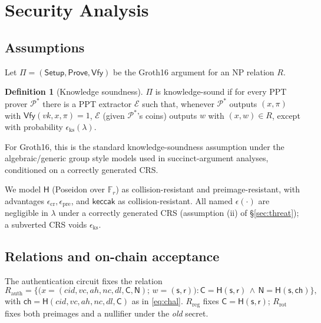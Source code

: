 \documentclass[11pt]{article}
\theoremstyle{definition}
\newtheorem{definition}{Definition}
\theoremstyle{plain}
\newcommand{\Hash}{\mathsf{H}}       %
\newcommand{\keccak}{\mathsf{keccak}}
\newcommand{\Fr}{\mathbb{F}_r}       %
\newcommand{\secret}{\mathsf{s}}
\newcommand{\salt}{\mathsf{r}}
\newcommand{\commit}{\mathsf{C}}
\newcommand{\chal}{\mathsf{ch}}
\newcommand{\nul}{\mathsf{N}}
\begin{document}
\section{Security Analysis}
\label{sec:security}

\subsection{Assumptions}
\label{sec:assumptions}
Let $\Pi=(\mathsf{Setup},\mathsf{Prove},\mathsf{Vfy})$ be the Groth16 argument for an
NP relation $R$.

\begin{definition}[Knowledge soundness]
$\Pi$ is knowledge-sound if for every PPT prover $\mathcal{P}^*$ there is a PPT
extractor $\mathcal{E}$ such that, whenever $\mathcal{P}^*$ outputs $(x,\pi)$ with
$\mathsf{Vfy}(vk,x,\pi)=1$, $\mathcal{E}$ (given $\mathcal{P}^*$'s coins) outputs $w$
with $(x,w)\in R$, except with probability $\epsilon_{\mathrm{ks}}(\lambda)$.
\end{definition}

For Groth16, this is the standard knowledge-soundness assumption under the
algebraic/generic group style models used in succinct-argument analyses, conditioned
on a correctly generated CRS.

We model $\Hash$ (Poseidon over $\Fr$) as collision-resistant and preimage-resistant,
with advantages $\epsilon_{\mathrm{cr}},\epsilon_{\mathrm{pre}}$, and $\keccak$ as
collision-resistant. All named $\epsilon(\cdot)$ are negligible in $\lambda$ under a
correctly generated CRS (assumption (ii) of \S\ref{sec:threat}); a subverted CRS
voids $\epsilon_{\mathrm{ks}}$.

\subsection{Relations and on-chain acceptance}
The authentication circuit fixes the relation
\[
R_{\mathrm{auth}}=\Big\{\big(x=(\mathit{cid},\mathit{vc},\mathit{ah},\mathit{nc},
\mathit{dl},\commit,\nul);\, w=(\secret,\salt)\big):
\commit=\Hash(\secret,\salt)\,\wedge\,\nul=\Hash(\secret,\chal)\Big\},
\]
with $\chal=\Hash(\mathit{cid},\mathit{vc},\mathit{ah},\mathit{nc},\mathit{dl},\commit)$
as in \eqref{eq:chal}. $R_{\mathrm{reg}}$ fixes $\commit=\Hash(\secret,\salt)$;
$R_{\mathrm{rot}}$ fixes both preimages and a nullifier under the \emph{old} secret.
\end{document}
